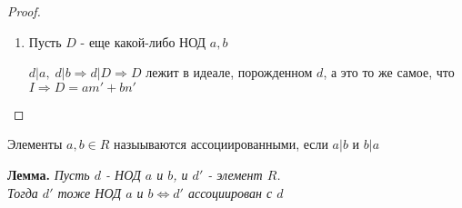 \begin{normalsize}
\begin{theorem-non}
\begin{proof}
\begin{enumerate}
                \item Пусть $D$ - еще какой-либо НОД $a, b$ 

                $d | a, \; d|b \Longrightarrow d | D \Longrightarrow D$ лежит в идеале, порожденном $d$, а это то же самое, что $I \Longrightarrow D = am' + bn'$ 
            \end{enumerate}
        \end{proof}
    \end{theorem-non}
        \begin{conj}
            Элементы $a, b \in R$ назыываются ассоциированными, если $a|b$ и $b|a$
        \end{conj}
        \textbf{Лемма.}
        \textit{Пусть $d$ - НОД $a$ и $b$, и $d'$ - элемент $R$. \\
        Тогда $d'$ тоже НОД $a$ и $b \Longleftrightarrow d'$ ассоциирован с $d$}
\end{normalsize}